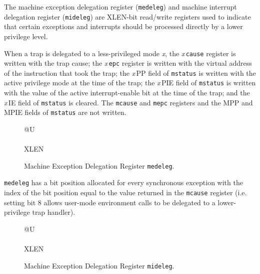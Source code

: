 The machine exception delegation register (\texttt{medeleg}) and machine interrupt delegation register (\texttt{mideleg}) are XLEN-bit read/write registers used to indicate that certain exceptions and interrupts should be processed directly by a lower privilege level.

When a trap is delegated to a less-privileged mode \emph{x}, the
\emph{x}\,\texttt{cause} register is written with the trap cause; the
\emph{x}\,\texttt{epc} register is written with the virtual address of
the instruction that took the trap; the \emph{x}\,PP field
of \texttt{mstatus} is written with the active privilege mode at the time of
the trap; the \emph{x}\,PIE field of \texttt{mstatus} is written with the
value of the active interrupt-enable bit at the time of the trap; and
the \emph{x}\,IE field of \texttt{mstatus} is cleared.  The \texttt{mcause} and
\texttt{mepc} registers and the MPP and MPIE fields of \texttt{mstatus} are
not written.

\ifdefined\MARKDOWN
\else

\begin{figure}[htb]
	{\footnotesize
		\begin{center}
			\begin{tabular}{@{}U}
				 \\
				\hline
				 \\
				\hline
				XLEN \\
			\end{tabular}
		\end{center}
	}
	\vspace{-0.1in}
	\caption{Machine Exception Delegation Register \texttt{medeleg}.}
	\label{fig:medelegreg}
\end{figure}
\fi

\texttt{medeleg} has a bit position allocated for every synchronous exception
with the index of the bit position equal to the value returned in the
\texttt{mcause} register (i.e. setting bit 8 allows user-mode environment calls
to be delegated to a lower-privilege trap handler).

\ifdefined\MARKDOWN
\else

\begin{figure}[htb]
	{\footnotesize
		\begin{center}
			\begin{tabular}{@{}U}
				\instbitrange{XLEN-1}{0} \\
				\hline
				\multicolumn{1}{|c|}{Interrupts} \\
				\hline
				XLEN \\
			\end{tabular}
		\end{center}
	}
	\vspace{-0.1in}
	\caption{Machine Exception Delegation Register \texttt{mideleg}.}
	\label{fig:midelegreg}
\end{figure}

